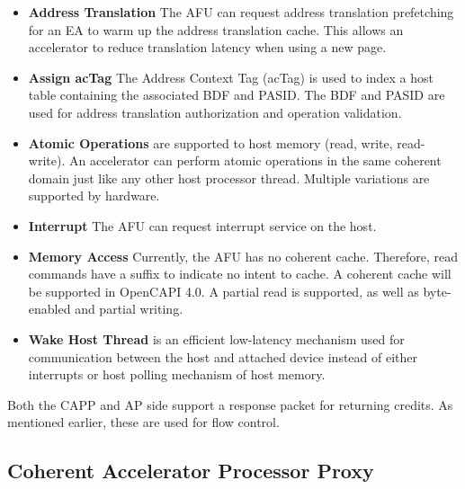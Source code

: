 \begin{itemize}
  \item{\textbf{Address Translation} The AFU can request address translation prefetching for an EA to warm up the address translation cache. This allows an accelerator to reduce translation latency when using a new page.}
  \item{\textbf{Assign acTag} The Address Context Tag (acTag) is used to index a host table containing the associated BDF and PASID. The BDF and PASID are used for address translation authorization and operation validation.}
  \item{\textbf{Atomic Operations} are supported to host memory (read, write, read-write). An accelerator can perform atomic operations in the same coherent domain just like any other host processor thread. Multiple variations are supported by hardware.}
  \item{\textbf{Interrupt} The AFU can request interrupt service on the host.}
  \item{\textbf{Memory Access} Currently, the AFU has no coherent cache. Therefore, read commands have a suffix to indicate no intent to cache. A coherent cache will be supported in OpenCAPI 4.0. A partial read is supported, as well as byte-enabled and partial writing.}
  \item{\textbf{Wake Host Thread} is an efficient low-latency mechanism used for communication between the host and attached device instead of either interrupts or host polling mechanism of host memory.}
\end{itemize}

Both the CAPP and AP side support a response packet for returning credits. As mentioned earlier, these are used for flow control.



\subsection{Coherent Accelerator Processor Proxy}
\label{sec:capp}


